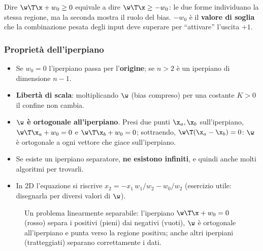 Dire $\w\T\x+w_0\ge0$ equivale a dire $\w\T\x\ge -w_0$: le due forme individuano la stessa regione, ma la seconda
mostra il ruolo del bias. $-w_0$ è il \textbf{valore di soglia} che la combinazione pesata degli input deve
superare per ``attivare'' l'uscita $+1$.

\subsubsection{Proprietà dell'iperpiano}
\begin{itemize}
  \item Se $w_0=0$ l'iperpiano passa per l'\textbf{origine}; se $n>2$ è un iperpiano di dimensione $n-1$.
  \item \textbf{Libertà di scala}: moltiplicando $\w$ (bias compreso) per una costante $K>0$ il confine non cambia.
  \item \textbf{$\w$ è ortogonale all'iperpiano}. Presi due punti $\x_a,\x_b$ sull'iperpiano,
        $\w\T\x_a+w_0=0$ e $\w\T\x_b+w_0=0$; sottraendo, $\w\T(\x_a-\x_b)=0$: $\w$ è ortogonale a ogni vettore
        che giace sull'iperpiano.
  \item Se esiste un iperpiano separatore, \textbf{ne esistono infiniti}, e quindi anche molti algoritmi per
        trovarli.
  \item In 2D l'equazione si riscrive $x_2 = -x_1\,w_1/w_2 - w_0/w_2$ (esercizio utile: disegnarla per diversi
        valori di $\w$).
\end{itemize}

\begin{figure}[ht]
\centering
{}
\caption{Un problema linearmente separabile: l'iperpiano $\w\T\x+w_0=0$ (rosso) separa i positivi (pieni) dai
negativi (vuoti), $\w$ è ortogonale all'iperpiano e punta verso la regione positiva; anche altri iperpiani
(tratteggiati) separano correttamente i dati.}
\label{fig:iperpiano}
\end{figure}

